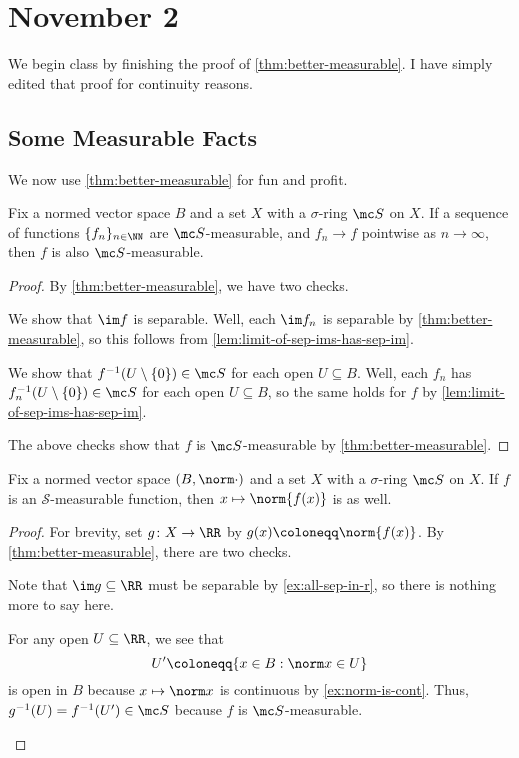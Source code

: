 \documentclass[../notes.tex]{subfiles}
\begin{document}
\section{November 2}

We begin class by finishing the proof of \autoref{thm:better-measurable}. I have simply edited that proof for continuity reasons.

\subsection{Some Measurable Facts}
We now use \autoref{thm:better-measurable} for fun and profit.
\begin{corollary} \label{cor:limit-of-meas-is-meas}
	Fix a normed vector space $B$ and a set $X$ with a $\sigma$-ring $\mc S$ on $X$. If a sequence of functions $\{f_n\}_{n\in\NN}$ are $\mc S$-measurable, and $f_n\to f$ pointwise as $n\to\infty$, then $f$ is also $\mc S$-measurable.
\end{corollary}
\begin{proof}
	By \autoref{thm:better-measurable}, we have two checks.
	\begin{listroman}
		\item We show that $\im f$ is separable. Well, each $\im f_n$ is separable by \autoref{thm:better-measurable}, so this follows from \autoref{lem:limit-of-sep-ims-has-sep-im}.
		\item We show that $f^{-1}(U\setminus\{0\})\in\mc S$ for each open $U\subseteq B$. Well, each $f_n$ has $f_n^{-1}(U\setminus\{0\})\in\mc S$ for each open $U\subseteq B$, so the same holds for $f$ by \autoref{lem:limit-of-sep-ims-has-sep-im}.
	\end{listroman}
	The above checks show that $f$ is $\mc S$-measurable by \autoref{thm:better-measurable}.
\end{proof}
\begin{corollary} \label{cor:take-norms-is-measurable}
	Fix a normed vector space $(B,\norm\cdot)$ and a set $X$ with a $\sigma$-ring $\mc S$ on $X$. If $f$ is an $\mathcal S$-measurable function, then $x\mapsto\norm{f(x)}$ is as well.
\end{corollary}
\begin{proof}
	For brevity, set $g\colon X\to\RR$ by $g(x)\coloneqq\norm{f(x)}$. By \autoref{thm:better-measurable}, there are two checks.
	\begin{listroman}
		\item Note that $\im g\subseteq\RR$ must be separable by \autoref{ex:all-sep-in-r}, so there is nothing more to say here.
		\item For any open $U\subseteq\RR$, we see that
		\[U'\coloneqq\{x\in B:\norm x\in U\}\]
		is open in $B$ because $x\mapsto\norm x$ is continuous by \autoref{ex:norm-is-cont}. Thus, $g^{-1}(U)=f^{-1}(U')\in\mc S$ because $f$ is $\mc S$-measurable.
		\qedhere
	\end{listroman}
\end{proof}
\end{document}
